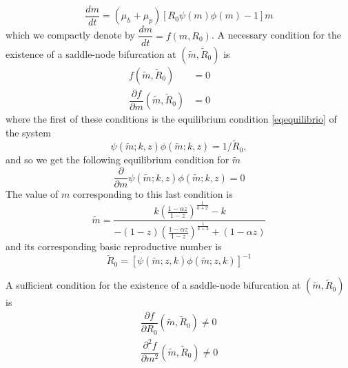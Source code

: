 \documentclass[eng]{MMSB-class-eng}
\begin{document}
\begin{equation*}
\dfrac{dm}{dt}=(\mu_h + \mu_p)\left[ R_0  \psi(m)\phi(m) -1 \right] m%
\end{equation*}
which we compactly denote by
$\dfrac{dm}{dt}=f(m,R_0)$.
A necessary condition for the existence of a saddle-node bifurcation at 
$(\tilde m,\tilde R_0)$ is
\begin{equation}
\begin{split}
f(\tilde m,\tilde R_0)&=0\qquad\\
\dfrac{\partial f}{\partial m}(\tilde m,\tilde R_0)&=0
\end{split}
\end{equation}
where the first of these conditions is the equilibrium condition \eqref{eqequilibrio} of the system
\begin{equation*}
\psi(\tilde m;k,z)\phi(\tilde m;k,z)=1/\tilde R_0,
\end{equation*}
and so we get the following equilibrium condition for $\tilde m$
\begin{equation}
\frac{\partial }{\partial m}\psi(\tilde m;k,z)\phi(\tilde m;k,z)=0	
\end{equation}
The value of $m$ corresponding to this last condition is
\begin{equation}
\tilde m=\dfrac{k\left( \frac{1-\alpha z}{1-z}\right)^{\frac{1}{k+2}} - k}{-(1-z)\left( \frac{1-\alpha z}{1-z}\right)^{\frac{1}{k+2}} + (1-\alpha z)}	
\end{equation}
and its corresponding basic reproductive number is
\begin{equation}
\tilde R_0=\left[ \psi(\tilde m;z,k)\phi(\tilde m;z,k)\right]^{-1}
\end{equation}	

A sufficient condition for the existence of a saddle-node bifurcation at $(\tilde m,\tilde R_0)$ is
\begin{equation}
\begin{split}
\dfrac{\partial f }{\partial R_0}(\tilde m,\tilde R_0)\neq0\\
\dfrac{\partial^2 f }{\partial m^2}(\tilde m,\tilde R_0)\neq0
\end{split}
\end{equation}
\end{document}
